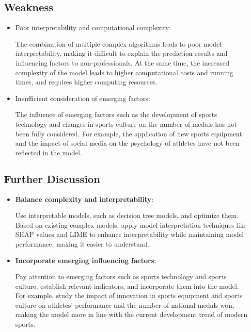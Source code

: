 \documentclass{mcmthesis}  %
\begin{document}
\subsection{Weakness}  %
\begin{itemize}  %
\item Poor interpretability and computational complexity: 

The combination of multiple complex algorithms leads to poor model interpretability, making it difficult to explain the prediction results and influencing factors to non-professionals. At the same time, the increased complexity of the model leads to higher computational costs and running times, and requires higher computing resources.
\item Insufficient consideration of emerging factors: 

The influence of emerging factors such as the development of sports technology and changes in sports culture on the number of medals has not been fully considered. For example, the application of new sports equipment and the impact of social media on the psychology of athletes have not been reflected in the model.
\end{itemize}  %

\subsection{Further Discussion}  %
\begin{itemize}  %
\item \textbf{Balance complexity and interpretability}: 

Use interpretable models, such as decision tree models, and optimize them. Based on existing complex models, apply model interpretation techniques like SHAP values and LIME to enhance interpretability while maintaining model performance, making it easier to understand.
\item \textbf{Incorporate emerging influencing factors}: 

Pay attention to emerging factors such as sports technology and sports culture, establish relevant indicators, and incorporate them into the model. For example, study the impact of innovation in sports equipment and sports culture on athletes' performance and the number of national medals won, making the model more in line with the current development trend of modern sports.
\end{itemize}  %
\end{document}
